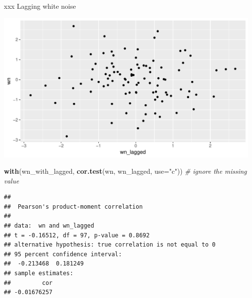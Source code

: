 \documentclass[ignorenonframetext,]{beamer}
\newenvironment{Shaded}{\begin{snugshade}}{\end{snugshade}}
\newcommand{\CommentTok}[1]{\textcolor[rgb]{0.56,0.35,0.01}{\textit{#1}}}
\newcommand{\DataTypeTok}[1]{\textcolor[rgb]{0.13,0.29,0.53}{#1}}
\newcommand{\KeywordTok}[1]{\textcolor[rgb]{0.13,0.29,0.53}{\textbf{#1}}}
\newcommand{\NormalTok}[1]{#1}
\newcommand{\OperatorTok}[1]{\textcolor[rgb]{0.81,0.36,0.00}{\textbf{#1}}}
\newcommand{\StringTok}[1]{\textcolor[rgb]{0.31,0.60,0.02}{#1}}
\begin{document}
\begin{frame}[fragile]{xxx Lagging white noise}
\protect\hypertarget{xxx-lagging-white-noise}{}

\begin{Shaded}
\end{Shaded}

\includegraphics{figure/unnamed-chunk-26-1.pdf}

\begin{Shaded}
\begin{Highlighting}[]
\KeywordTok{with}\NormalTok{(wn_with_lagged, }\KeywordTok{cor.test}\NormalTok{(wn, wn_lagged, }\DataTypeTok{use=}\StringTok{"c"}\NormalTok{)) }\CommentTok{# ignore the missing value}
\end{Highlighting}
\end{Shaded}

\begin{verbatim}
## 
##  Pearson's product-moment correlation
## 
## data:  wn and wn_lagged
## t = -0.16512, df = 97, p-value = 0.8692
## alternative hypothesis: true correlation is not equal to 0
## 95 percent confidence interval:
##  -0.213468  0.181249
## sample estimates:
##         cor 
## -0.01676257
\end{verbatim}

\end{frame}
\end{document}
